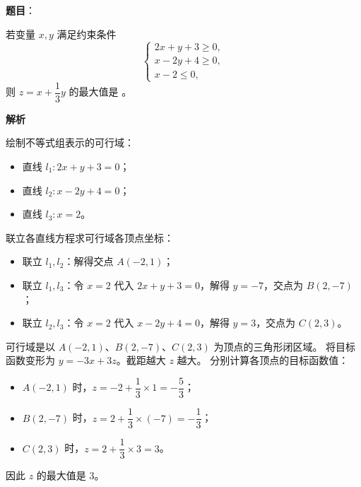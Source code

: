 \begin{answer}

\textbf{题目}：

若变量 $x, y$ 满足约束条件
\nopagebreak[4]
\[
\begin{cases}
2x + y + 3 \geqslant 0, \\
x - 2y + 4 \geqslant 0, \\
x - 2 \leqslant 0,
\end{cases}
\]
则 $z = x + \dfrac13 y$ 的最大值是 \underline{\hspace{2cm}}。

\textbf{解析}

绘制不等式组表示的可行域：
\begin{itemize}
\item 直线 $l_1: 2x + y + 3 = 0$；
\item 直线 $l_2: x - 2y + 4 = 0$；
\item 直线 $l_3: x = 2$。
\end{itemize}
联立各直线方程求可行域各顶点坐标：
\begin{itemize}
\item 联立 $l_1, l_2$：解得交点 $A(-2, 1)$；
\item 联立 $l_1, l_3$：令 $x = 2$ 代入 $2x + y + 3 = 0$，解得 $y = -7$，交点为 $B(2, -7)$；
\item 联立 $l_2, l_3$：令 $x = 2$ 代入 $x - 2y + 4 = 0$，解得 $y = 3$，交点为 $C(2, 3)$。
\end{itemize}
可行域是以 $A(-2, 1)$、$B(2, -7)$、$C(2, 3)$ 为顶点的三角形闭区域。
将目标函数变形为 $y = -3x + 3z$。截距越大 $z$ 越大。
分别计算各顶点的目标函数值：
\begin{itemize}
\item $A(-2, 1)$ 时，$z = -2 + \dfrac13\times 1 = -\dfrac53$；
\item $B(2, -7)$ 时，$z = 2 + \dfrac13\times(-7) = -\dfrac13$；
\item $C(2, 3)$ 时，$z = 2 + \dfrac13\times 3 = 3$。
\end{itemize}
因此 $z$ 的最大值是 $3$。


\end{answer}
